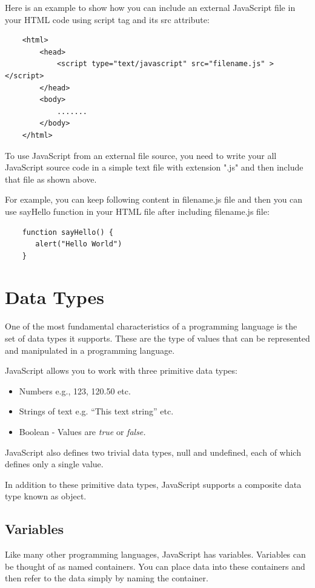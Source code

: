 \documentclass[11pt,a4paper]{article}
\begin{document}
Here is an example to show how you can include an external JavaScript file in your HTML code using script tag and its src attribute:
\begin{verbatim}
    <html>
        <head>
            <script type="text/javascript" src="filename.js" ></script>
        </head>
        <body>
            .......
        </body>
    </html>
\end{verbatim}
To use JavaScript from an external file source, you need to write your all JavaScript source code in a simple text file with extension ".js" and then include that file as shown above.

For example, you can keep following content in filename.js file and then you can use sayHello function in your HTML file after including filename.js file:
\begin{verbatim}
    function sayHello() {
       alert("Hello World")
    }
\end{verbatim}

\section*{Data Types}

One of the most fundamental characteristics of a programming language is the set of data types it supports. These are the type of values that can be represented and manipulated in a programming language.

JavaScript allows you to work with three primitive data types:
\begin{itemize}
\item Numbers e.g., 123, 120.50 etc.
\item Strings of text e.g. ``This text string'' etc.
\item Boolean - Values are \emph{true} or \emph{false.}
\end{itemize}

JavaScript also defines two trivial data types, null and undefined, each of which defines only a single value.

In addition to these primitive data types, JavaScript supports a composite data type known as object.

\subsection*{Variables}
Like many other programming languages, JavaScript has variables. Variables can be thought of as named containers. You can place data into these containers and then refer to the data simply by naming the container.
\end{document}
